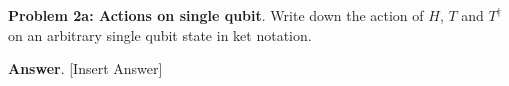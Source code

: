 \textbf{Problem 2a: Actions on single qubit}. Write down the action of $H$, $T$ and $T^\dag$ on an arbitrary single qubit state in ket notation.


\textbf{Answer}. [Insert Answer]


